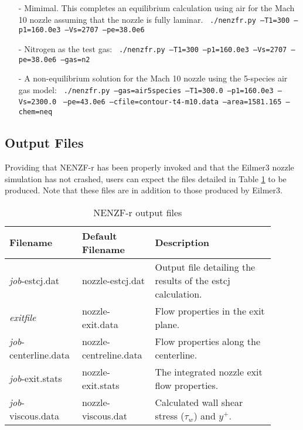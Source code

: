 \begin{itemize}
\item[-] Mimimal. This completes an equilibrium calculation using air for the Mach 10 nozzle assuming that the nozzle is fully laminar. 
\newline
\texttt{   ./nenzfr.py --T1=300 --p1=160.0e3 --Vs=2707 --pe=38.0e6}
\item[-] Nitrogen as the test gas:
\newline
\texttt{   ./nenzfr.py --T1=300 --p1=160.0e3 --Vs=2707 --pe=38.0e6 --gas=n2}
\item[-] A non-equilibrium solution for the Mach 10 nozzle using the 5-species air gas model:
\newline
\texttt{   ./nenzfr.py --gas=air5species --T1=300.0 --p1=160.0e3 --Vs=2300.0}
\newline
\texttt{       --pe=43.0e6 --cfile=contour-t4-m10.data --area=1581.165 --chem=neq}
\end{itemize}

\subsection{Output Files}
Providing that NENZF-r has been properly invoked and that the Eilmer3 nozzle simulation has not crashed, users can expect the files detailed in Table \ref{tab:output-files} to be produced. Note that these files are in addition to those produced by Eilmer3.

\begin{table}[!ht]
\centering
\caption{NENZF-r output files}
\begin{tabular}{p{0.22\linewidth}|p{0.25\linewidth}|p{0.43\linewidth}} 
\hline
Filename & Default Filename & Description \\ 
\hline
\textit{job}-estcj.dat & nozzle-estcj.dat & Output file detailing the results of the estcj calculation.\\
\textit{exitfile} & nozzle-exit.data & Flow properties in the exit plane.\\
\textit{job}-centerline.data & nozzle-centreline.data & Flow properties along the centerline.\\
\textit{job}-exit.stats & nozzle-exit.stats & The integrated nozzle exit flow properties.\\
\textit{job}-viscous.data & nozzle-viscous.dat & Calculated wall shear stress ($\tau_w$) and $y^+$.\\
\hline 
\end{tabular}
\label{tab:output-files}
\end{table}


